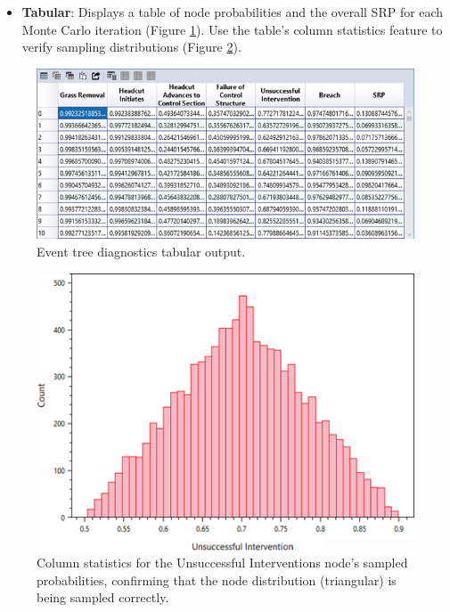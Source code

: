 \documentclass[
]{book}
\providecommand{\tightlist}{%
  \setlength{\itemsep}{0pt}\setlength{\parskip}{0pt}}
\begin{document}
\begin{itemize}
\tightlist
\item
  \textbf{Tabular}: Displays a table of node probabilities and the overall SRP for each Monte Carlo iteration (Figure \ref{fig:figure-98}). Use the table's column statistics feature to verify sampling distributions (Figure \ref{fig:figure-99}).
\end{itemize}

\begin{figure}

{\centering \includegraphics{images/figure98} 

}

\caption{Event tree diagnostics tabular output.}\label{fig:figure-98}
\end{figure}

\begin{figure}

{\centering \includegraphics{images/figure99} 

}

\caption{Column statistics for the Unsuccessful Interventions node’s sampled probabilities, confirming that the node distribution (triangular) is being sampled correctly.}\label{fig:figure-99}
\end{figure}
\end{document}
